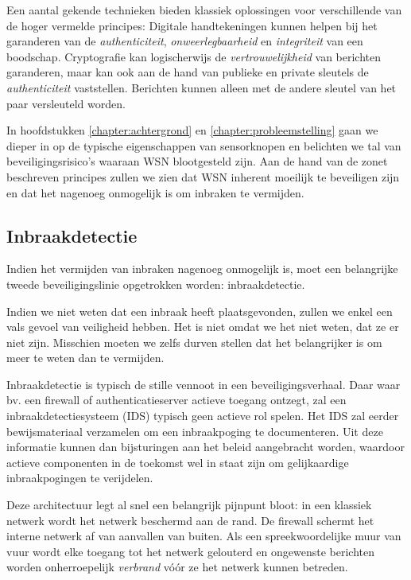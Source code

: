 Een aantal gekende technieken bieden klassiek oplossingen voor verschillende
van de hoger vermelde principes: Digitale handtekeningen kunnen helpen bij het
garanderen van de \emph{authenticiteit}, \emph{onweerlegbaarheid} en
\emph{integriteit} van een boodschap. Cryptografie kan logischerwijs de
\emph{vertrouwelijkheid} van berichten garanderen, maar kan ook aan de hand van
publieke en private sleutels de \emph{authenticiteit} vaststellen. Berichten
kunnen alleen met de andere sleutel van het paar versleuteld worden.

In hoofdstukken \ref{chapter:achtergrond} en \ref{chapter:probleemstelling}
gaan we dieper in op de typische eigenschappen van sensorknopen en belichten we
tal van beveiligingsrisico's waaraan WSN blootgesteld zijn. Aan de hand van de
zonet beschreven principes zullen we zien dat WSN inherent moeilijk te
beveiligen zijn en dat het nagenoeg onmogelijk is om inbraken te vermijden.

\subsection{Inbraakdetectie}
\label{subsection:detection}

Indien het vermijden van inbraken nagenoeg onmogelijk is, moet een belangrijke
tweede beveiligingslinie opgetrokken worden: inbraakdetectie.

Indien we niet weten dat een inbraak heeft plaatsgevonden, zullen we enkel een
vals gevoel van veiligheid hebben. Het is niet omdat we het niet weten, dat ze
er niet zijn. Misschien moeten we zelfs durven stellen dat het belangrijker is
om meer te weten dan te vermijden.

Inbraakdetectie is typisch de stille vennoot in een beveiligingsverhaal. Daar
waar bv. een firewall of authenticatieserver actieve toegang ontzegt, zal een
inbraakdetectiesysteem (IDS) typisch geen actieve rol spelen. Het IDS zal
eerder bewijsmateriaal verzamelen om een inbraakpoging te documenteren. Uit
deze informatie kunnen dan bijsturingen aan het beleid aangebracht worden,
waardoor actieve componenten in de toekomst wel in staat zijn om gelijkaardige
inbraakpogingen te verijdelen.

Deze architectuur legt al snel een belangrijk pijnpunt bloot: in een klassiek
netwerk wordt het netwerk beschermd aan de rand. De firewall schermt het
interne netwerk af van aanvallen van buiten. Als een spreekwoordelijke muur van
vuur wordt elke toegang tot het netwerk gelouterd en ongewenste berichten
worden onherroepelijk \emph{verbrand} v\'o\'or ze het netwerk kunnen betreden.

